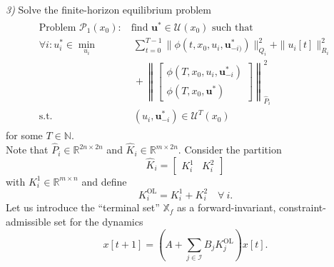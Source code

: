 \documentclass[letterpaper, 10 pt, conference]{ieeeconf}  %
\newcommand{\R}{\mathbb{R}}
\newcommand{\N}{\mathbb{N}}
\newcommand{\mc}{\mathcal}
\newcommand{\Kol}{K^{\mathrm{OL}}}
\newcommand{\bu}{\boldsymbol{u}}
\newcommand{\X}{\mathbb{X}}
\newcommand{\tsum}{\textstyle\sum}
\begin{document}
\emph{3)} Solve the finite-horizon equilibrium problem
\begin{align} \label{eq:finite_hor_problem}
\begin{split}
\text{Problem $\mc P_1(x_0)$:}&~ \text{find $\bu^*\in\mc U(x_0)$ such that}\\ 
    \forall i: u_i^* \in \min_{u_i} &~~\sum_{t=0}^{T-1} \|\phi(t, x_0, u_i, \bu^*_{-i)})\|_{Q_i}^2 + \|u_i[t]\|^2_{R_i} \\ 
    &~~+\left\| \begin{bmatrix}
        \phi(T, x_0, u_i, \bu^*_{-i})\\
        \phi(T, x_0, \bu^*)
    \end{bmatrix} \right\|^2_{\hat{P}_i}\\
    \text{s.t.}&~~ (u_i, \bu^*_{-i})\in\mc U^T(x_0)
\end{split}
\end{align}
for some $T\in\N$. \\
Note that $\hat{P}_i\in\R^{2n\times 2n}$ and $\hat{K}_i\in\R^{m\times 2n}$. Consider the partition 
\begin{equation}
    \hat{K}_i = \begin{bmatrix}
        K_i^1 & K_i^2
    \end{bmatrix}
\end{equation}
with $K_i^1\in\R^{m\times n}$ and define 
\begin{equation}
    \Kol_i = K_i^1 + K_i^2 \quad \forall ~i.
\end{equation}
Let us introduce the ``terminal set'' $\X_f$ as a forward-invariant, constraint-admissible set for the dynamics 
$$x[t+1]=(A + \tsum_{j\in\mc I} B_j \Kol_j) x[t].$$
\end{document}
